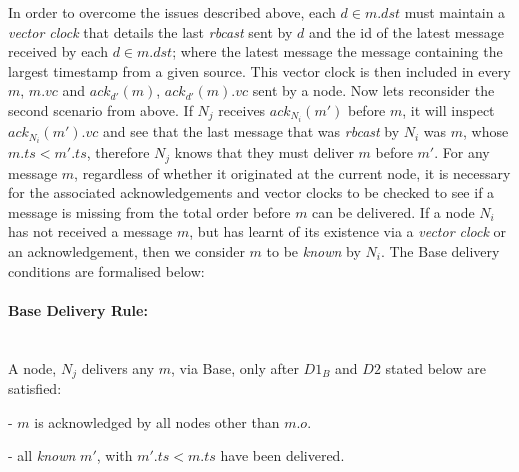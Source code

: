     In order to overcome the issues described above, each $d \in m.dst$ must maintain a \emph{vector clock}\citep{Mattern88virtualtime, fidge1988timestamps} that details the last \emph{rbcast} sent by $d$ and the id of the latest message received by each $d \in m.dst$; where the latest message the message containing the largest timestamp from a given source.  This vector clock is then included in every $m$, $m.vc$ and $ack_{d'}(m)$, $ack_{d'}(m).vc$ sent by a node.  Now lets reconsider the second scenario from above.  If $N_j$ receives $ack_{N_i}(m')$ before $m$, it will inspect $ack_{N_i}(m').vc$ and see that the last message that was \emph{rbcast} by $N_i$ was $m$, whose $m.ts < m'.ts$, therefore $N_j$ knows that they must deliver $m$ before $m'$.  For any message $m$, regardless of whether it originated at the current node, it is necessary for the associated acknowledgements and vector clocks to be checked to see if a message is missing from the total order before $m$ can be delivered.  If a node $N_i$ has not received a message $m$, but has learnt of its existence via a \emph{vector clock} or an acknowledgement, then we consider $m$ to be \emph{known} by $N_i$.  The \textsf{Base} delivery conditions are formalised below:
    
    \paragraph{\textsf{Base} Delivery Rule:}\hspace{0pt} \\
	    A node, $N_j$ delivers any $m$, via \textsf{Base}, only after $D1_B$ and $D2$ stated below are satisfied:
	    \begin{description}[labelindent=1cm]
	        \item[$\boldsymbol{D1_B}$] - $m$ is acknowledged by all nodes other than $m.o$. 
	        \item[$\boldsymbol{D2}$] - all \emph{known} $m'$, with $m'.ts < m.ts$ have been delivered.
	    \end{description}
    
